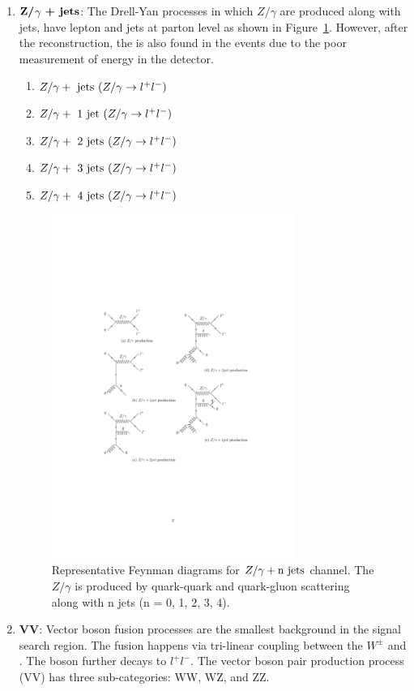 \begin{enumerate}[leftmargin=*]
\item ${\bf{Z/}}$$\gamma$ ${\bf{+ jets}}$: The Drell-Yan processes in which 
	$Z/\gamma$ are produced along with jets, have lepton and jets at parton level as 
	shown in Figure~\ref{fig:feyn_diag_dyjet}. However, after the 
	reconstruction, the \MET is also found in the events due to the poor 
	measurement of energy in the detector.
	\begin{enumerate}[leftmargin=*]
  	\item $Z/\gamma +\rm{ jets   }(Z/\gamma \rightarrow l^+ l^-)$
  	\item $Z/\gamma +\rm{ 1 jet  }(Z/\gamma \rightarrow l^+ l^-)$
  	\item $Z/\gamma +\rm{ 2 jets }(Z/\gamma \rightarrow l^+ l^-)$
  	\item $Z/\gamma +\rm{ 3 jets }(Z/\gamma \rightarrow l^+ l^-)$
  	\item $Z/\gamma +\rm{ 4 jets }(Z/\gamma \rightarrow l^+ l^-)$
  	\end{enumerate}
	\begin{figure}
	\begin{center}
	\includegraphics[width=0.75\textwidth]{Image/FeynDiag/feyn_diag_dyjet.pdf}
	\caption{Representative Feynman diagrams for $ Z/\gamma + \rm{n jets}$ channel. 
	The $Z/\gamma$ is produced by quark-quark and quark-gluon scattering 
	along with n jets (n = 0, 1, 2, 3, 4).}
	\label{fig:feyn_diag_dyjet}
	\end{center}
	\end{figure}

\item {\bf{VV}}: Vector boson fusion processes are the smallest background in the signal 
	search region. The fusion happens via tri-linear coupling between the 
	$W^\pm$ and \PZ. The \PZ boson further decays to $l^+l^-$. The vector boson pair production process (VV) has 
	three sub-categories: WW, WZ, and ZZ.
\end{enumerate}

